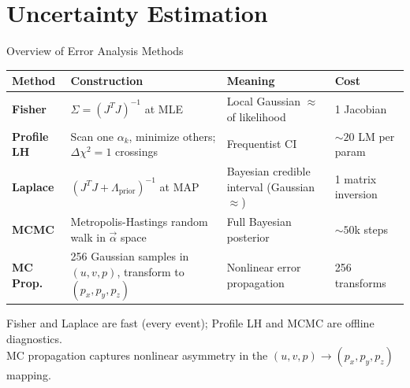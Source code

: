 \documentclass[aspectratio=169]{beamer}
\begin{document}
\section{Uncertainty Estimation}

\begin{frame}{Overview of Error Analysis Methods}
\small
\begin{table}
\centering
\begin{tabular}{p{}p{}p{}p{}}
\toprule
Method & Construction & Meaning & Cost \\
\midrule
\textbf{Fisher} & $\Sigma = (J^TJ)^{-1}$ at MLE & Local Gaussian $\approx$ of likelihood & 1 Jacobian \\
\textbf{Profile LH} & Scan one $\alpha_k$, minimize others; $\Delta\chi^2 = 1$ crossings & Frequentist CI & $\sim\!20$ LM per param \\
\textbf{Laplace} & $(J^TJ + \Lambda_\mathrm{prior})^{-1}$ at MAP & Bayesian credible interval (Gaussian $\approx$) & 1 matrix inversion \\
\textbf{MCMC} & Metropolis-Hastings random walk in $\vec{\alpha}$ space & Full Bayesian posterior & $\sim\!50$k steps \\
\textbf{MC Prop.} & 256 Gaussian samples in $(u,v,p)$, transform to $(p_x,p_y,p_z)$ & Nonlinear error propagation & 256 transforms \\
\bottomrule
\end{tabular}
\end{table}

\vspace{0.1cm}
Fisher and Laplace are fast (every event); Profile LH and MCMC are offline diagnostics.\\
MC propagation captures nonlinear asymmetry in the $(u,v,p) \to (p_x,p_y,p_z)$ mapping.
\end{frame}
\end{document}
